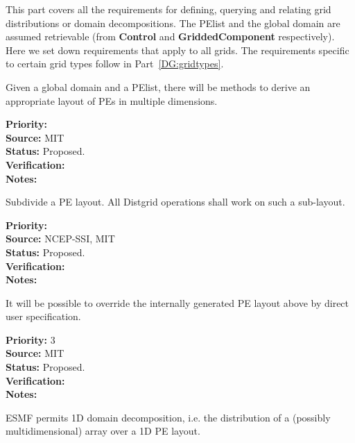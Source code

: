 
This part covers all the requirements for defining, querying and
relating grid distributions or domain decompositions. The PElist and
the global domain are assumed retrievable (from \textbf{Control} and
\textbf{GriddedComponent} respectively). Here we set down requirements
that apply to all grids. The requirements specific to certain grid
types follow in Part~\ref{DG:gridtypes}.



Given a global domain and a PElist, there will be methods to derive an
appropriate layout of PEs in multiple dimensions.

\begin{reqlist}
{\bf Priority:} \\
{\bf Source:} MIT \\
{\bf Status:} Proposed. \\
{\bf Verification:} \\
{\bf Notes:}
\end{reqlist}


Subdivide a PE layout.  All Distgrid operations shall work on such a sub-layout.

\begin{reqlist}
{\bf Priority:} \\
{\bf Source:} NCEP-SSI, MIT \\
{\bf Status:} Proposed. \\
{\bf Verification:} \\
{\bf Notes:}
\end{reqlist}


It will be possible to override the internally generated PE layout above
by direct user specification.

\begin{reqlist}
{\bf Priority:} 3 \\ 
{\bf Source:} MIT \\
{\bf Status:} Proposed. \\
{\bf Verification:} \\
{\bf Notes:}
\end{reqlist}


ESMF permits 1D domain decomposition, i.e. the distribution of a
(possibly multidimensional) array over a 1D PE layout.

